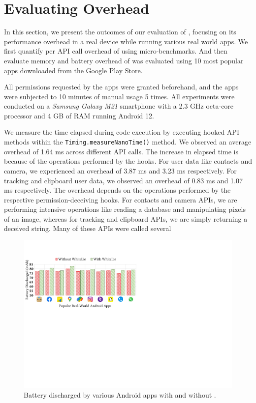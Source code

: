 \section{Evaluating Overhead}
\label{sec:results}

In this section, we present the outcomes of our evaluation of \framework{}, focusing on its performance overhead in a real device while running various real world apps.  We first quantify per API call overhead of \framework{} using micro-benchmarks. And then evaluate memory and battery overhead of \framework{} was evaluated using 10 most popular apps downloaded from the Google Play Store.

All permissions requested by the apps were granted beforehand, and the apps were subjected to 10 minutes of manual usage 5 times. All experiments were conducted on a \textit{Samsung Galaxy M21} smartphone with a 2.3 GHz octa-core processor and 4 GB of RAM running Android 12. 

We measure the time elapsed during code execution by executing hooked API methods within the \texttt{Timing.measureNanoTime()} method. We observed an average overhead of 1.64 ms across different API calls. The increase in elapsed time is because of the operations performed by the hooks. For user data like contacts and camera, we experienced an overhead of 3.87 ms and 3.23 ms respectively. For tracking and clipboard user data, we observed an overhead of 0.83 ms and 1.07 ms respectively. The overhead depends on the operations performed by the respective permission-deceiving hooks. For contacts and camera APIs, we are performing intensive operations like reading a database and manipulating pixels of an image, whereas for tracking and clipboard APIs, we are simply returning a deceived string. Many of these APIs were called several 

\begin{figure}[b!]
    \centering
    \includegraphics[width=0.8\linewidth]{Figures/Performance Evaluation/results_battery_discharged_real_world_apps.pdf}
    \caption{Battery discharged by various Android apps with and without \framework{}.}
    \label{fig:reslts_btryDschrgd}
\end{figure}

